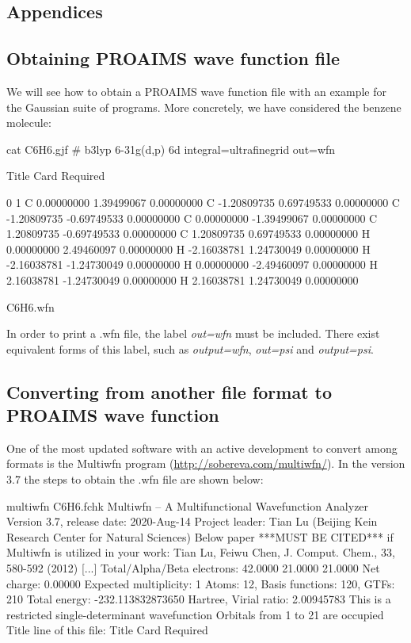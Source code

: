 \documentclass[a4paper,11pt,openany]{memoir}
\begin{document}
\begin{appendices} 
\chapter{Appendices}
\section{Obtaining PROAIMS wave function file}\label{appx:getwfn}

We will see how to obtain a PROAIMS wave function file with an example for the Gaussian suite of programs. More concretely, we have considered the benzene molecule:
	\begin{consola}{cat C6H6.gjf}
# b3lyp 6-31g(d,p) 6d integral=ultrafinegrid
out=wfn

Title Card Required

0 1
C                  0.00000000    1.39499067    0.00000000
C                 -1.20809735    0.69749533    0.00000000
C                 -1.20809735   -0.69749533    0.00000000
C                  0.00000000   -1.39499067    0.00000000
C                  1.20809735   -0.69749533    0.00000000
C                  1.20809735    0.69749533    0.00000000
H                  0.00000000    2.49460097    0.00000000
H                 -2.16038781    1.24730049    0.00000000
H                 -2.16038781   -1.24730049    0.00000000
H                  0.00000000   -2.49460097    0.00000000
H                  2.16038781   -1.24730049    0.00000000
H                  2.16038781    1.24730049    0.00000000

C6H6.wfn
	\end{consola}

In order to print a .wfn file, the label \emph{out=wfn} must be included. There exist equivalent forms of this label, such as \emph{output=wfn}, \emph{out=psi} and \emph{output=psi}.

\section{Converting from another file format to PROAIMS wave function}\label{appx:convertwfn}
One of the most updated software with an active development to convert among formats is the Multiwfn program (\url{http://sobereva.com/multiwfn/}). In the version 3.7 the steps to obtain the .wfn file are shown below:
\begin{consola}{multiwfn C6H6.fchk}
Multiwfn -- A Multifunctional Wavefunction Analyzer
Version 3.7, release date: 2020-Aug-14
Project leader: Tian Lu (Beijing Kein Research Center for Natural Sciences)
Below paper ***MUST BE CITED*** if Multiwfn is utilized in your work:
Tian Lu, Feiwu Chen, J. Comput. Chem., 33, 580-592 (2012)
[...]
 Total/Alpha/Beta electrons:     42.0000     21.0000     21.0000
Net charge:     0.00000      Expected multiplicity:    1
Atoms:     12,  Basis functions:    120,  GTFs:    210
Total energy:    -232.113832873650 Hartree,   Virial ratio:  2.00945783
This is a restricted single-determinant wavefunction
Orbitals from 1 to    21 are occupied
Title line of this file: Title Card Required


\end{consola}
\end{appendices}
\end{document}
